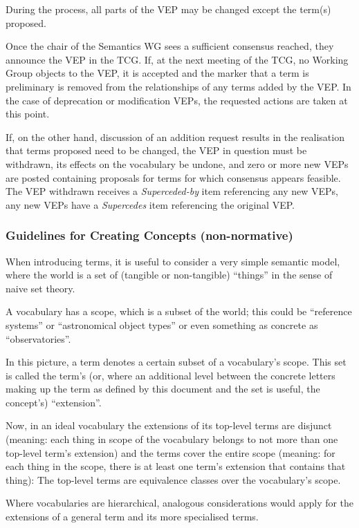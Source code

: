 \documentclass[11pt,a4paper]{ivoa}
\newcommand{\vepitem}[1]{\emph{#1}}
\begin{document}
During the process, all parts of the VEP may be changed except the
term(s) proposed.

Once the chair of the Semantics WG sees a sufficient consensus reached,
they announce the VEP in the TCG.  If, at the next meeting of the TCG,
no Working Group objects to the VEP, it is accepted and the marker that
a term is preliminary is removed from the relationships of any terms
added by the VEP.  In the case of deprecation or modification VEPs, the
requested actions are taken at this point.

If, on the other hand, discussion of an addition request results in the
realisation that terms proposed need to be changed, the VEP in question
must be withdrawn, its effects on the vocabulary be undone, and zero or
more new VEPs are posted containing proposals for terms for which
consensus appears feasible.  The VEP withdrawn receives a
\vepitem{Superceded-by} item referencing any new VEPs, any new VEPs have
a \vepitem{Supercedes} item referencing the original VEP.

\subsubsection{Guidelines for Creating Concepts (non-normative)}

When introducing terms, it is useful to consider a very simple
semantic model, where the world is a set of (tangible or non-tangible)
``things'' in the sense of naive set theory.

A vocabulary has a scope, which is a subset of the world; this could be
``reference systems'' or ``astronomical object types'' or even something
as concrete as ``observatories''.

In this picture, a term denotes a certain subset of a vocabulary's
scope.  This set is called the term's (or, where an additional level
between the concrete letters making up the term as defined by this
document and the set is useful, the concept's) ``extension''.

Now, in an ideal vocabulary the extensions of its
top-level terms are disjunct (meaning: each thing in scope of the vocabulary
belongs to not more than one top-level term's extension) and the terms cover the
entire scope (meaning: for each thing in the scope, there is at least
one term's extension that contains that thing): The top-level terms are
equivalence classes over the vocabulary's scope.

Where vocabularies are hierarchical, analogous considerations would
apply for the extensions of a general term and its more specialised
terms.
\end{document}
